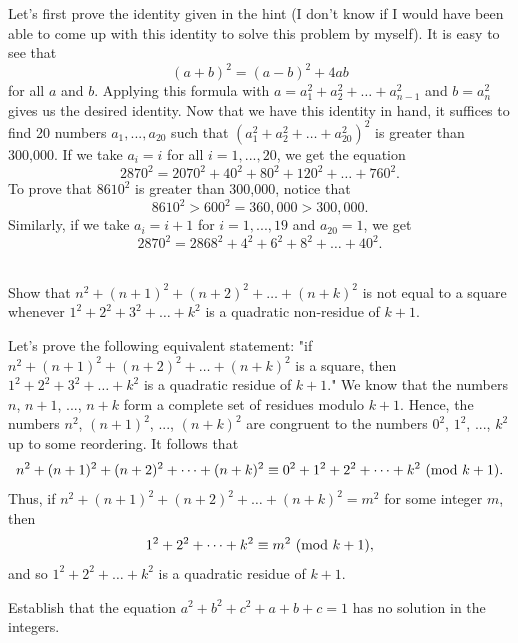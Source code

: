 \begin{solution}
    Let's first prove the identity given in the hint (I don't know if I would have been able to come up with this identity to solve this problem by myself). It is easy to see that 
    $$(a+b)^2 = (a - b)^2 + 4ab$$
    for all $a$ and $b$. Applying this formula with $a = a_1^2 + a_2^2 + \dots + a_{n-1}^2$ and $b = a_n^2$ gives us the desired identity. Now that we have this identity in hand, it suffices to find 20 numbers $a_1, ..., a_{20}$ such that $(a_1^2 + a_2^2 + \dots + a_{20}^2)^2$ is greater than 300,000. If we take $a_i = i$ for all $i = 1, ..., 20$, we get the equation
    $$2870^2 = 2070^2 + 40^2 + 80^2 + 120^2 + \dots + 760^2.$$
    To prove that $8610^2$ is greater than 300,000, notice that
    $$8610^2 > 600^2 = 360,000 > 300,000.$$
    Similarly, if we take $a_i = i+1$ for $i = 1, ..., 19$ and $a_{20} = 1$, we get
    $$2870^2 = 2868^2 + 4^2 + 6^2 + 8^2 + \dots + 40^2.$$ \\
\end{solution}

\begin{exercise}
    Show that $n^2 + (n+1)^2 + (n+2)^2 + \dots + (n+k)^2$ is not equal to a square whenever $1^2 + 2^2 + 3^2 + \dots + k^2$ is a quadratic non-residue of $k + 1$.\\
\end{exercise}

\begin{solution}
    Let's prove the following equivalent statement: "if $n^2 + (n+1)^2 + (n+2)^2 + \dots + (n+k)^2$ is a square, then $1^2 + 2^2 + 3^2 + \dots + k^2$ is a quadratic residue of $k + 1$." We know that the numbers $n$, $n+1$, ..., $n+k$ form a complete set of residues modulo $k+1$. Hence, the numbers $n^2$, $(n+1)^2$, ..., $(n+k)^2$ are congruent to the numbers $0^2$, $1^2$, ..., $k^2$ up to some reordering. It follows that
    $$n^2 + (n+1)^2 + (n+2)^2 + \dots + (n+k)^2 \equiv 0^2 + 1^2 + 2^2 + \dots +k^2 \ (\mathrm{mod}\ k+1).$$
    Thus, if $n^2 + (n+1)^2 + (n+2)^2 + \dots + (n+k)^2 = m^2$ for some integer $m$, then
    $$1^2 + 2^2 + \dots +k^2 \equiv m^2 \ (\mathrm{mod}\ k+1),$$
    and so $1^2 + 2^2 + \dots +k^2$ is a quadratic residue of $k+1$. \\
\end{solution}

\begin{exercise}
    Establish that the equation $a^2 + b^2 + c^2 + a + b + c = 1$ has no solution in the integers.  \\
\end{exercise}

